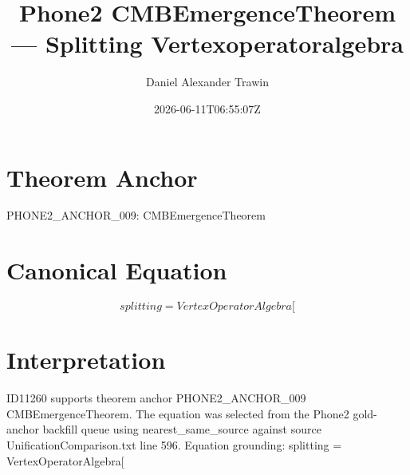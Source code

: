 \documentclass[11pt]{article}
\title{Phone2 CMBEmergenceTheorem — Splitting Vertexoperatoralgebra}
\author{Daniel Alexander Trawin}
\date{2026-06-11T06:55:07Z}
\begin{document}
\maketitle
\section*{Theorem Anchor}
PHONE2_ANCHOR_009: CMBEmergenceTheorem
\section*{Canonical Equation}
\[
splitting = VertexOperatorAlgebra[
\]
\section*{Interpretation}
ID11260 supports theorem anchor PHONE2_ANCHOR_009 CMBEmergenceTheorem. The equation was selected from the Phone2 gold-anchor backfill queue using nearest_same_source against source UnificationComparison.txt line 596. Equation grounding: splitting = VertexOperatorAlgebra[
\end{document}
